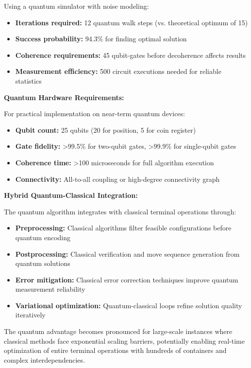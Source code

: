 \documentclass{article}
\begin{document}
Using a quantum simulator with noise modeling:
\begin{itemize}
\item \textbf{Iterations required:} 12 quantum walk steps (vs. theoretical optimum of 15)
\item \textbf{Success probability:} 94.3\% for finding optimal solution
\item \textbf{Coherence requirements:} 45 qubit-gates before decoherence affects results
\item \textbf{Measurement efficiency:} 500 circuit executions needed for reliable statistics
\end{itemize}

\textbf{Quantum Hardware Requirements:}

For practical implementation on near-term quantum devices:
\begin{itemize}
\item \textbf{Qubit count:} 25 qubits (20 for position, 5 for coin register)
\item \textbf{Gate fidelity:} >99.5\% for two-qubit gates, >99.9\% for single-qubit gates
\item \textbf{Coherence time:} >100 microseconds for full algorithm execution
\item \textbf{Connectivity:} All-to-all coupling or high-degree connectivity graph
\end{itemize}

\textbf{Hybrid Quantum-Classical Integration:}

The quantum algorithm integrates with classical terminal operations through:
\begin{itemize}
\item \textbf{Preprocessing:} Classical algorithms filter feasible configurations before quantum encoding
\item \textbf{Postprocessing:} Classical verification and move sequence generation from quantum solutions
\item \textbf{Error mitigation:} Classical error correction techniques improve quantum measurement reliability
\item \textbf{Variational optimization:} Quantum-classical loops refine solution quality iteratively
\end{itemize}

The quantum advantage becomes pronounced for large-scale instances where classical methods face exponential scaling barriers, potentially enabling real-time optimization of entire terminal operations with hundreds of containers and complex interdependencies.
\end{document}
